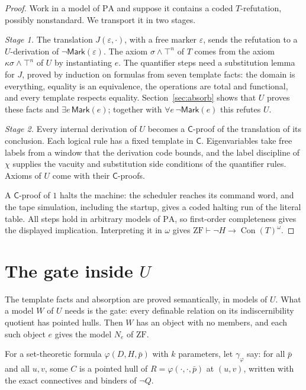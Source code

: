 \documentclass[11pt,letterpaper]{article}
\newcommand{\ZF}{\mathrm{ZF}}
\newcommand{\PA}{\mathrm{PA}}
\newcommand{\Con}{\operatorname{Con}}
\newcommand{\Cc}{\mathsf{C}}
\newcommand{\mk}{\mathsf{Mark}}
\begin{document}
\begin{proof}
Work in a model of $\PA$ and suppose it contains a coded $T$-refutation,
possibly nonstandard. We transport it in two stages.

\emph{Stage 1.} The translation $J(\varepsilon,\cdot)$, with a free marker
$\varepsilon$, sends the refutation to a $U$-derivation of $\neg\mk(\varepsilon)$.
The axiom $\sigma\wedge\top^n$ of $T$ comes from the axiom
$\kappa\sigma\wedge\top^n$ of $U$ by instantiating $e$. The quantifier steps
need a substitution lemma for $J$, proved by induction on formulas from
seven template facts: the domain is everything, equality is an equivalence,
the operations are total and functional, and every template respects
equality. Section~\ref{sec:absorb} shows that $U$ proves these facts and
$\exists e\,\mk(e)$; together with $\forall e\,\neg\mk(e)$ this refutes $U$.

\emph{Stage 2.} Every internal derivation of $U$ becomes a $\Cc$-proof of
the translation of its conclusion. Each logical rule has a fixed template
in $\Cc$. Eigenvariables take free labels from a window that the derivation
code bounds, and the label discipline of $\chi$ supplies the vacuity and
substitution side conditions of the quantifier rules. Axioms of $U$ come
with their $\Cc$-proofs.

A $\Cc$-proof of $1$ halts the machine: the scheduler reaches its command
word, and the tape simulation, including the startup, gives a coded halting
run of the literal table. All steps hold in arbitrary models of $\PA$,
so first-order completeness gives the displayed implication. Interpreting
it in $\omega$ gives $\ZF\vdash\neg H\to\Con(T)^\omega$.
\end{proof}

\section{The gate inside \texorpdfstring{$U$}{U}}\label{sec:gate}

The template facts and absorption are proved semantically, in models of
$U$. What a model $W$ of $U$ needs is the gate: every definable relation
on its indiscernibility quotient has pointed hulls. Then $W$ has an object
with no members, and each such object $e$ gives the model $N_e$ of $\ZF$.

For a set-theoretic formula $\varphi(D,H,\bar p)$ with $k$ parameters, let
$\gamma_\varphi$ say: for all $\bar p$ and all $u,v$, some $C$ is a pointed
hull of $R=\varphi(\cdot,\cdot,\bar p)$ at $(u,v)$, written with the exact
connectives and binders of $\neg Q$.
\end{document}
